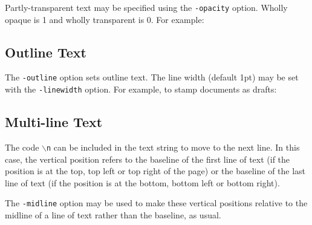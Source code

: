 \documentclass{book}
\begin{document}
\noindent{}

\noindent Partly-transparent text may be specified using the \verb!-opacity! option. Wholly opaque is 1 and wholly transparent is 0. For example:




\noindent{}


\subsection{Outline Text}

  The \texttt{-outline} option sets outline text. The line width (default 1pt)
  may be set with the \texttt{-linewidth} option. For example, to stamp
  documents as drafts:


\noindent{}


\subsection{Multi-line Text}

The code \texttt{$\backslash$n} can be included in the text string to move to
the next line. In this case, the vertical position refers to the baseline of
the first line of text (if the position is at the top, top left or top right of
the page) or the baseline of the last line of text (if the position is at the
bottom, bottom left or bottom right).

\noindent{}



\noindent The \texttt{-midline} option may be used to make these vertical positions
relative to the midline of a line of text rather than the baseline, as usual.
\end{document}
